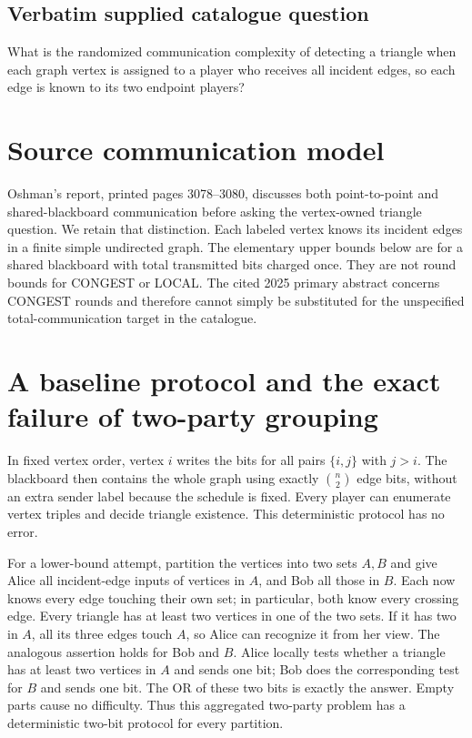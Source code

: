 \documentclass[11pt]{article}
\begin{document}
\subsection{Verbatim supplied catalogue question}
What is the randomized communication complexity of detecting a triangle when each graph vertex is assigned to a player who receives all incident edges, so each edge is known to its two endpoint players?

\section{Source communication model}
Oshman's report, printed pages 3078--3080, discusses both point-to-point
and shared-blackboard communication before asking the vertex-owned
triangle question. We retain that distinction. Each labeled vertex
knows its incident edges in a finite simple undirected graph.
The elementary upper bounds below are for a shared blackboard with
total transmitted bits charged once. They are not round bounds for
CONGEST or LOCAL. The cited 2025 primary abstract concerns CONGEST
rounds and therefore cannot simply be substituted for the unspecified
total-communication target in the catalogue.

\section{A baseline protocol and the exact failure of two-party grouping}
In fixed vertex order, vertex $i$ writes the bits for all pairs
$\{i,j\}$ with $j>i$. The blackboard then contains the whole graph
using exactly $\binom n2$ edge bits, without an extra sender label
because the schedule is fixed. Every player can enumerate vertex triples
and decide triangle existence. This deterministic protocol has no error.

For a lower-bound attempt, partition the vertices into two sets $A,B$
and give Alice all incident-edge inputs of vertices in $A$, and Bob all
those in $B$. Each now knows every edge touching their own set; in
particular, both know every crossing edge. Every triangle has at least
two vertices in one of the two sets. If it has two in $A$, all its
three edges touch $A$, so Alice can recognize it from her view. The
analogous assertion holds for Bob and $B$.
Alice locally tests whether a triangle has at least two vertices in
$A$ and sends one bit; Bob does the corresponding test for $B$ and
sends one bit. The OR of these two bits is exactly the answer.
Empty parts cause no difficulty. Thus this aggregated two-party
problem has a deterministic two-bit protocol for every partition.
\end{document}
